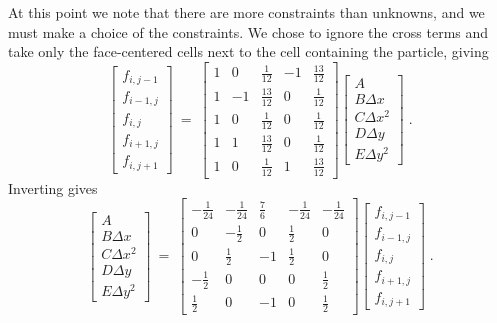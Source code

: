 At this point we note that there are more constraints than unknowns,
and we must make a choice of the constraints. We chose to ignore
the cross terms and take only the face-centered cells next to
the cell containing the particle, giving
\begin{equation}
\left[ \begin{array}{c}
f_{i,j-1} \\ f_{i-1,j} \\ f_{i,j} \\
f_{i+1,j} \\ f_{i,j+1}
\end{array} \right] \: = \:
\left[ \begin{array}{cccccc}
1 &  0 & \frac{1}{12}  & -1 &  \frac{13}{12}  \\
1 & -1 & \frac{13}{12} &  0 &  \frac{1}{12}   \\
1 &  0 & \frac{1}{12}  &  0 &  \frac{1}{12}   \\
1 &  1 & \frac{13}{12} &  0 &  \frac{1}{12}   \\
1 &  0 & \frac{1}{12}  &  1 &  \frac{13}{12}
\end{array} \right]
\left[ \begin{array}{c}
A \\ B\Delta x \\ C \Delta x^2 \\
D \Delta y \\ E \Delta y^2
\end{array} \right] \; .
\end{equation}
Inverting gives
\begin{equation}
\left[ \begin{array}{c}
A \\ B\Delta x \\ C \Delta x^2 \\
D \Delta y \\ E \Delta y^2
\end{array} \right]
\: = \:
\left[ \begin{array}{cccccc}
-\frac{1}{24} & -\frac{1}{24}  & \frac{7}{6}  & -\frac{1}{24}  & -\frac{1}{24}  \\
0             & -\frac{1}{2}   & 0            &  \frac{1}{2}   &  0   \\
0             & \frac{1}{2}    & -1           &  \frac{1}{2}   &  0   \\
-\frac{1}{2}  &  0             & 0            &  0             &  \frac{1}{2}   \\
\frac{1}{2}    &  0             & -1           &  0             &  \frac{1}{2}
\end{array} \right]
\left[ \begin{array}{c}
f_{i,j-1} \\ f_{i-1,j} \\ f_{i,j} \\
f_{i+1,j} \\ f_{i,j+1}
\end{array} \right]  \; .
\end{equation}
